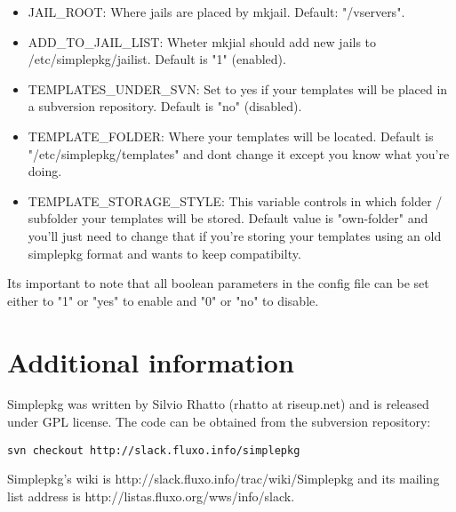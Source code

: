 \documentclass{article}
\begin{document}
\begin{itemize}
  \item JAIL\_ROOT: Where jails are placed by mkjail. Default: "/vservers".
  \item ADD\_TO\_JAIL\_LIST: Wheter mkjial should add new jails to /etc/simplepkg/jailist. Default is "1" (enabled).  
  \item TEMPLATES\_UNDER\_SVN: Set to yes if your templates will be placed in a subversion repository. Default is "no" (disabled).
  \item TEMPLATE\_FOLDER: Where your templates will be located. Default is "/etc/simplepkg/templates" and dont change it except you know what you're doing.
  \item TEMPLATE\_STORAGE\_STYLE: This variable controls in which folder / subfolder your templates will be stored. Default value is "own-folder" and you'll just need to change that if you're storing your templates using an old simplepkg format and wants to keep compatibilty.
\end{itemize}

Its important to note that all boolean parameters in the config file can be set either to "1" or "yes" to enable and "0" or "no" to disable.

\section{Additional information}

Simplepkg was written by Silvio Rhatto (rhatto at riseup.net) and is released under GPL license. The code can be obtained from the subversion repository:

\begin{verbatim}
svn checkout http://slack.fluxo.info/simplepkg
\end{verbatim}

Simplepkg's wiki is http://slack.fluxo.info/trac/wiki/Simplepkg and its mailing list address is http://listas.fluxo.org/wws/info/slack.
\end{document}
